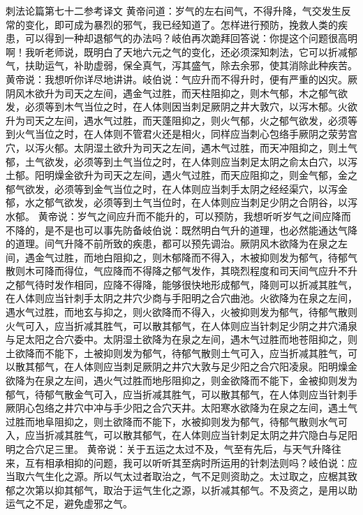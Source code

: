 \documentclass[a4paper,12pt,UTF8,twoside]{ctexbook}
\begin{document}
刺法论篇第七十二参考译文
黄帝问道：岁气的左右间气，不得升降，气交发生反常的变化，即可成为暴烈的邪气，我已经知道了。怎样进行预防，挽救人类的疾患，可以得到一种却退郁气的办法吗？岐伯再次跪拜回答说：你提这个问题很高明啊！我听老师说，既明白了天地六元之气的变化，还必须深知刺法，它可以折减郁气，扶助运气，补助虚弱，保全真气，泻其盛气，除去余邪，使其消除此种疾苦。黄帝说：我想听你详尽地讲讲。岐伯说：气应升而不得升时，便有严重的凶灾。厥阴风木欲升为司天之左间，遇金气过胜，而天柱阻抑之，则木气郁，木之郁气欲发，必须等到木气当位之时，在人体则因当刺足厥阴之井大敦穴，以泻木郁。火欲升为司天之左间，遇水气过胜，而天蓬阻抑之，则火气郁，火之郁气欲发，必须等到火气当位之时，在人体则不管君火还是相火，同样应当刺心包络手厥阴之荥劳宫穴，以泻火郁。太阴湿土欲升为司天之左间，遇木气过胜，而天冲阻抑之，则土气郁，土气欲发，必须等到土气当位之时，在人体则应当刺足太阴之俞太白穴，以泻土郁。阳明燥金欲升为司天之左间，遇火气过胜，而天应阻抑之，则金气郁，金之郁气欲发，必须等到金气当位之时，在人体则应当刺手太阴之经经渠穴，以泻金郁，水之郁气欲发，必须等到土气当位时，在人体则应当刺足少阴之合阴谷，以泻水郁。
黄帝说：岁气之间应升而不能升的，可以预防，我想听听岁气之间应降而不降的，是不是也可以事先防备岐伯说：既然明白气升的道理，也必然能通达气降的道理。间气升降不前所致的疾患，都可以预先调治。厥阴风木欲降为在泉之左间，遇金气过胜，而地白阻抑之，则木郁降而不得入，木被抑则发为郁气，待郁气散则木可降而得位，气应降而不得降之郁气发作，其晓烈程度和司天间气应升不升之郁气待时发作相同，应降不得降，能够很快地形成郁气，降则可以折减其胜气，在人体则应当针刺手太阴之井穴少商与手阳明之合穴曲池。火欲降为在泉之左间，遇水气过胜，而地玄与抑之，则火欲降而不得入，火被抑则发为郁气，待郁气散则火气可入，应当折减其胜气，可以散其郁气，在人体则应当针刺足少阴之井穴涌泉与足太阳之合穴委中。太阴湿土欲降为在泉之左间，遇木气过胜而地苍阻抑之，则土欲降而不能下，土被抑则发为郁气，待郁气散则土气可入，应当折减其胜气，可以散其郁气，在人体则应当刺足厥阴之井穴大敦与足少阳之合穴阳凌泉。阳明燥金欲降为在泉之左间，遇火气过胜而地彤阻抑之，则金欲降而不能下，金被抑则发为郁气，待郁气散金气可入，应当折减其胜气，可以散其郁气，在人体则应当针刺手厥阴心包络之井穴中冲与手少阳之合穴天井。太阳寒水欲降为在泉之左间，遇土气过胜而地阜阻抑之，则土欲降而不能下，水被抑则发为郁气，待郁气散则水气可入，应当折减其胜气，可以散其郁气，在人体则应当针刺足太阴之井穴隐白与足阳明之合穴足三里。
黄帝说：关于五运之太过不及，气至有先后，与天气升降往来，互有相承相抑的问题，我可以听听其至病时所运用的针刺法则吗？岐伯说：应当取六气生化之源。所以气太过者取治之，气不足则资助之。太过取之，应椐其致郁之次第以抑其郁气，取治于运气生化之源，以折减其郁气。不及资之，是用以助运气之不足，避免虚邪之气。
\end{document}
